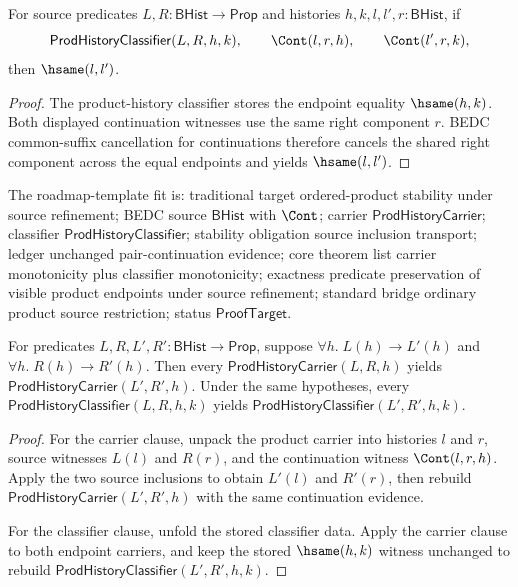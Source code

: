 \begin{theorem}
\label{thm:prod-history-classifier-common-right-component-left-hsame}
For source predicates $L,R:\mathsf{BHist}\to\mathsf{Prop}$ and histories
$h,k,l,l',r:\mathsf{BHist}$, if
$$
\mathsf{ProdHistoryClassifier}(L,R,h,k),
\qquad
\Cont(l,r,h),
\qquad
\Cont(l',r,k),
$$
then $\hsame(l,l')$.
\end{theorem}
\begin{proof}
The product-history classifier stores the endpoint equality $\hsame(h,k)$.
Both displayed continuation witnesses use the same right component $r$.
BEDC common-suffix cancellation for continuations therefore cancels the shared
right component across the equal endpoints and yields $\hsame(l,l')$.
\end{proof}

\begin{theorem}
\label{thm:prod-history-source-monotonicity}
The roadmap-template fit is: traditional target ordered-product stability
under source refinement; BEDC source $\mathsf{BHist}$ with $\Cont$; carrier
$\mathsf{ProdHistoryCarrier}$; classifier $\mathsf{ProdHistoryClassifier}$;
stability obligation source inclusion transport; ledger unchanged
pair-continuation evidence; core theorem list carrier monotonicity plus
classifier monotonicity; exactness predicate preservation of visible product
endpoints under source refinement; standard bridge ordinary product source
restriction; status $\mathsf{ProofTarget}$.

For predicates $L,R,L',R':\mathsf{BHist}\to\mathsf{Prop}$, suppose
$\forall h.\; L(h)\to L'(h)$ and $\forall h.\; R(h)\to R'(h)$. Then every
$\mathsf{ProdHistoryCarrier}(L,R,h)$ yields
$\mathsf{ProdHistoryCarrier}(L',R',h)$. Under the same hypotheses, every
$\mathsf{ProdHistoryClassifier}(L,R,h,k)$ yields
$\mathsf{ProdHistoryClassifier}(L',R',h,k)$.
\end{theorem}
\begin{proof}
For the carrier clause, unpack the product carrier into histories $l$ and $r$,
source witnesses $L(l)$ and $R(r)$, and the continuation witness
$\Cont(l,r,h)$. Apply the two source inclusions to obtain $L'(l)$ and $R'(r)$,
then rebuild $\mathsf{ProdHistoryCarrier}(L',R',h)$ with the same continuation
evidence.

For the classifier clause, unfold the stored classifier data. Apply the carrier
clause to both endpoint carriers, and keep the stored $\hsame(h,k)$ witness
unchanged to rebuild $\mathsf{ProdHistoryClassifier}(L',R',h,k)$.
\end{proof}

